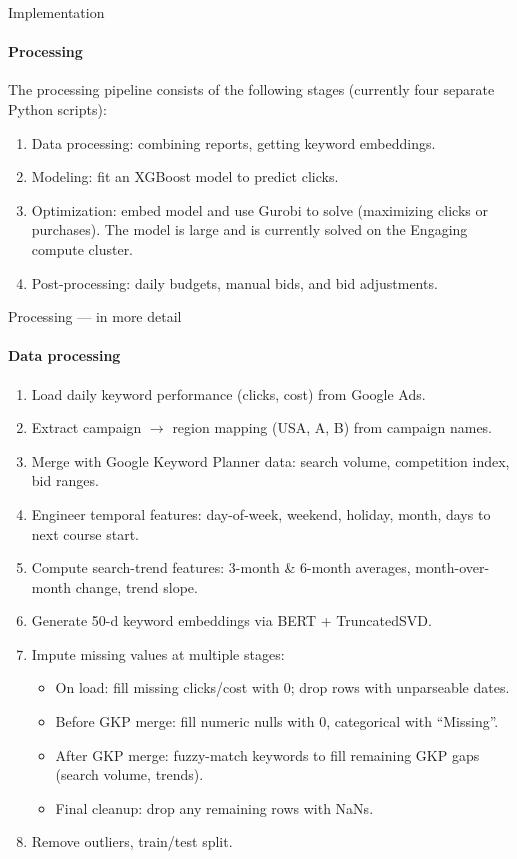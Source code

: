 \documentclass[smaller]{beamer}
\newif\ifdetailed
\begin{document}
\begin{frame}{Implementation}
\framesubtitle{Processing}
The processing pipeline consists of the following stages (currently four separate Python scripts):
\begin{enumerate}
    \item Data processing: combining reports, getting keyword embeddings.
    \item Modeling: fit an XGBoost model to predict clicks.
    \item Optimization: embed model and use Gurobi to solve (maximizing clicks or purchases).
          The model is large and is currently solved on the Engaging compute cluster.
    \item Post-processing: daily budgets, manual bids, and bid adjustments.
\end{enumerate}
\end{frame}

\ifdetailed

\begin{frame}{Processing --- in more detail}
\framesubtitle{Data processing}
\begin{enumerate}
    \item Load daily keyword performance (clicks, cost) from Google Ads.
    \item Extract campaign $\to$ region mapping (USA, A, B) from campaign names.
    \item Merge with Google Keyword Planner data: search volume, competition index, bid ranges.
    \item Engineer temporal features: day-of-week, weekend, holiday, month, days to next course start.
    \item Compute search-trend features: 3-month \& 6-month averages, month-over-month change, trend slope.
    \item Generate 50-d keyword embeddings via BERT + TruncatedSVD.
    \item Impute missing values at multiple stages:
    \begin{itemize}
        \item On load: fill missing clicks/cost with 0; drop rows with unparseable dates.
        \item Before GKP merge: fill numeric nulls with 0, categorical with ``Missing''.
        \item After GKP merge: fuzzy-match keywords to fill remaining GKP gaps (search volume, trends).
        \item Final cleanup: drop any remaining rows with NaNs.
    \end{itemize}
    \item Remove outliers, train/test split.
\end{enumerate}
\end{frame}
\end{document}
